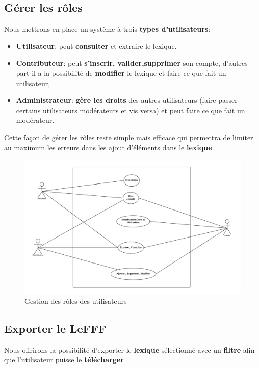 \subsection{Gérer les rôles}
Nous mettrons en place un système à trois \textbf{types d'utilisateurs}:
\begin{itemize}
\item \textbf{Utilisateur}:  peut \textbf{consulter} et extraire le lexique.
\item \textbf{Contributeur}: peut \textbf{s'inscrir, valider,supprimer} son compte, d'autres part il a la possibilité de \textbf{modifier} le lexique et faire ce que fait un utilisateur,
\item \textbf{Administrateur}: \textbf{gère les droits} des autres utilisateurs (faire passer certains utilisateurs modérateurs et vis versa) et peut faire ce que fait un modérateur.
\end{itemize}
{Cette façon de gérer les rôles reste simple mais efficace qui permettra de limiter au maximum les erreurs dans les ajout d'éléments dans le \textbf{lexique}.\par}

\begin{figure}[ht]
    \centering
    \includegraphics[scale=0.3]{uml.png}
    \caption{Gestion des rôles des utilisateurs }
\end{figure}


 \subsection{Exporter le LeFFF}

{Nous offrirons la possibilité d'exporter le \textbf{lexique} sélectionné avec un \textbf{filtre} afin que l'utilisateur puisse le \textbf{télécharger}\par}

